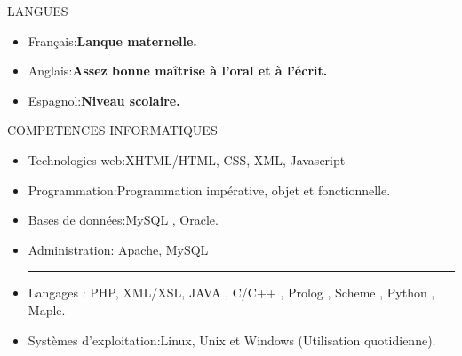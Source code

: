 \documentclass[a4paper]{article}
\begin{document}
\textcolor[gray]{0.6}{{\Large  LANGUES}}




\noindent 
\newline
\begin{itemize}
\item  Français:\textbf{\hspace*{0.9cm}Lanque maternelle.}
\newline
\item  Anglais:\textbf{\hspace*{0.7cm}Assez bonne maîtrise à l’oral et à l’écrit.}
\newline
\item Espagnol:\textbf{\hspace*{0.7cm}Niveau scolaire.}
\newline
\newline
\end{itemize}




\textcolor[gray]{0.6}{{\Large  COMPETENCES INFORMATIQUES}}
\noindent 
\newline
\newline




\begin{itemize}
\item  Technologies web:\hspace*{0.5cm}XHTML/HTML, CSS, XML, Javascript
\item  Programmation:\hspace*{0.7cm}Programmation impérative, objet et fonctionnelle.
\item   Bases de données:\hspace*{0.5cm}MySQL , Oracle.
\item   Administration:\hspace*{0.7cm} Apache, MySQL
\newline
\newline
\newline




\vspace{3pt}\hrule\vspace{6pt}%
\noindent  
\newline
\newline
\item   Langages :\hspace*{0.5cm} PHP, XML/XSL, JAVA , C/C++ , Prolog , Scheme , Python , Maple.
\item Systèmes d'exploitation:\hspace*{0.5cm}Linux, Unix et Windows (Utilisation quotidienne). 
\newline
\newline
\end{itemize}
\end{document}
